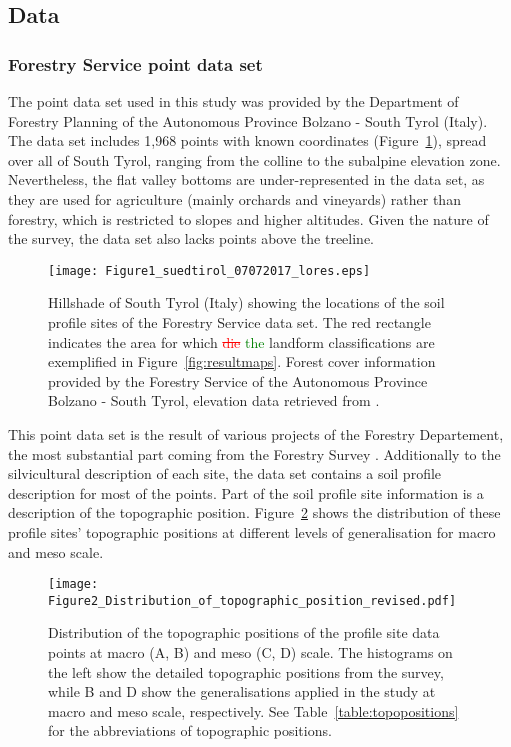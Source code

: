 \documentclass[preprint,12pt,authoryear]{elsarticle}
\begin{document}
\subsection{Data}
\subsubsection{Forestry Service point data set}
The point data set used in this study was provided by the Department of Forestry Planning of the Autonomous Province Bolzano - South Tyrol (Italy).
The data set includes 1,968 points with known coordinates (Figure~\ref{fig:datapoints}), spread over all of South Tyrol, ranging from the colline to the subalpine elevation zone. Nevertheless, the flat valley bottoms are under-represented in the data set, as they are used for agriculture (mainly orchards and vineyards) rather than forestry, which is restricted to slopes and higher altitudes. Given the nature of the survey, the data set also lacks points above the treeline.
\begin{figure}
\texttt{[image: Figure1\_suedtirol\_07072017\_lores.eps]}
\caption{Hillshade of South Tyrol (Italy) showing the locations of the soil profile sites of the Forestry Service data set. The red rectangle indicates the area for which \textcolor{red}{\sout{die}} \textcolor{green}{the} landform classifications are exemplified in Figure~\ref{fig:resultmaps}. Forest cover information provided by the Forestry Service of the Autonomous Province Bolzano - South Tyrol, elevation data retrieved from \cite{DTM}.}
\label{fig:datapoints}
\end{figure}
 This point data set is the result of  various projects of the Forestry Departement, the most substantial part coming from the Forestry Survey \citep{APB2006}. Additionally to the silvicultural description of each site, the data set contains a soil profile description for most of the points. Part of the soil profile site information is a description of the topographic position. Figure~\ref{fig:hist} shows the distribution of these profile sites' topographic positions at different levels of generalisation for macro and meso scale.

\begin{figure}
\texttt{[image: Figure2\_Distribution\_of\_topographic\_position\_revised.pdf]}
\caption{Distribution of the topographic positions of the profile site data points at macro (A, B) and meso (C, D) scale. The histograms on the left show the detailed topographic positions from the survey, while B and D show the generalisations applied in the study at macro and meso scale, respectively. See Table~\ref{table:topopositions} for the abbreviations of topographic positions.}
\label{fig:hist}
\end{figure}
\end{document}

